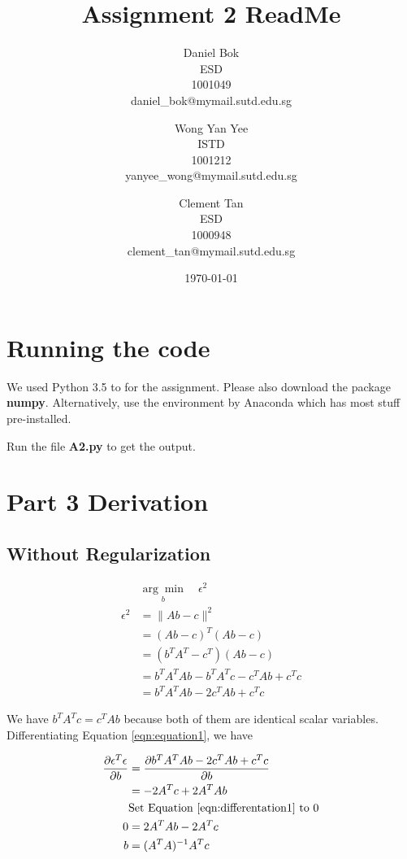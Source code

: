 \documentclass[]{article}
\title{Assignment 2 ReadMe}
\author{
	Daniel Bok \\
	ESD \\
	1001049 \\
	daniel\_bok@mymail.sutd.edu.sg 
	\and
	Wong Yan Yee\\ 
	ISTD \\
	1001212 \\
	yanyee\_wong@mymail.sutd.edu.sg
	\and
	Clement Tan \\
	ESD \\
	1000948 \\
	clement\_tan@mymail.sutd.edu.sg
}
\date{\today}
\begin{document}
	
\maketitle

\section{Running the code}

We used Python 3.5 to for the assignment. Please also download the package \textbf{numpy}. Alternatively, use the environment by Anaconda which has most stuff pre-installed.

Run the file \textbf{A2.py} to get the output.

\newpage
\section{Part 3 Derivation}

\subsection{Without Regularization}

\begin{align}
&\underset{b}{\arg\min} \quad \epsilon^2 \nonumber \\
\epsilon^2 &= \| Ab - c \|^2 \nonumber \\
&= (Ab - c)^T(Ab - c) \nonumber \\
&= (b^TA^T - c^T)(Ab - c) \nonumber \\
&= b^TA^TAb - b^TA^Tc - c^TAb + c^Tc \nonumber \\
&= b^TA^TAb - 2c^TAb + c^Tc \label{eqn:equation1}
\end{align}

We have  $b^TA^Tc = c^TAb$ because both of them are identical scalar variables. Differentiating Equation \ref{eqn:equation1}, we have

\begin{align}
\frac{\partial \epsilon^T\epsilon}{\partial b} 
	&= \frac{\partial b^TA^TAb - 2c^TAb + c^Tc}{\partial b} \nonumber \\
&= -2A^Tc + 2A^TAb \label{eqn:differentation1}\\
&\text{Set Equation \ref{eqn:differentation1} to 0} \nonumber \\ 
0 &= 2A^TAb - 2A^Tc \nonumber \\
b &= (A^TA)^{-1}A^Tc
\end{align}
\end{document}
